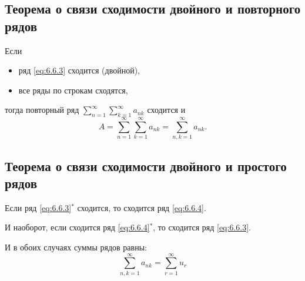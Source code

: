 \subsection{Теорема о связи сходимости двойного и повторного рядов}

\begin{theorem}
    Если
    \begin{itemize}
        \item ряд \ref{eq:6.6.3} сходится (двойной),
        \item все ряды по строкам сходятся,
    \end{itemize}
    тогда повторный ряд $ \sum_{n=1}^{\infty}\sum_{k=1}^{\infty}a_{nk} $ сходится и
    \[
        A = \sum_{n=1}^{\infty}\sum_{k=1}^{\infty}a_{nk} = \sum_{n,k=1}^{\infty}a_{nk}.
    \]
\end{theorem}

\subsection{Теорема о связи сходимости двойного и простого рядов}

\begin{theorem}
    Если ряд \ref{eq:6.6.3}$ ^* $ сходится, то сходится ряд \ref{eq:6.6.4}.

    И наоборот, если сходится ряд \ref{eq:6.6.4}$ ^* $, то сходится ряд \ref{eq:6.6.3}.

    И в обоих случаях суммы рядов равны:
    \[
        \sum_{n,k=1}^{\infty}a_{nk} = \sum_{r=1}^{\infty}u_r
    \]
\end{theorem}